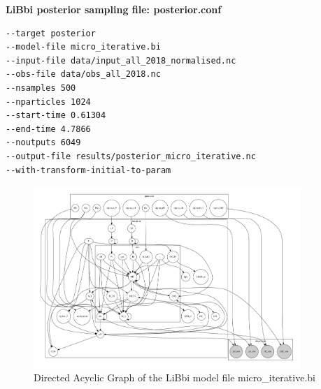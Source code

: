 \documentclass{ruthesis}
\begin{document}
\textbf{LiBbi posterior sampling file: posterior.conf}
\begin{lstlisting}
--target posterior
--model-file micro_iterative.bi
--input-file data/input_all_2018_normalised.nc
--obs-file data/obs_all_2018.nc
--nsamples 500
--nparticles 1024
--start-time 0.61304
--end-time 4.7866
--noutputs 6049
--output-file results/posterior_micro_iterative.nc
--with-transform-initial-to-param
\end{lstlisting}

\begin{figure}
	\centerline{\includegraphics[width=0.9\textwidth]{images_microalgae/micro_template.pdf}}
	\caption[.]{Directed Acyclic Graph of the LiBbi model file micro\_iterative.bi}
	\label{fig:micro_DAG}
\end{figure}


{}


%
%
\end{document}
